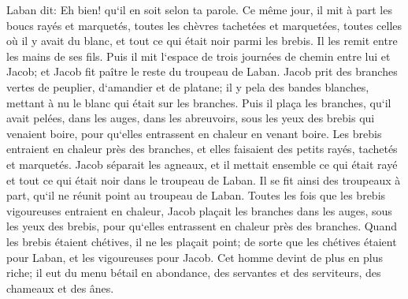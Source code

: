 \verse Laban dit: Eh bien! qu`il en soit selon ta parole. 
\verse Ce même jour, il mit à part les boucs rayés et marquetés, toutes les chèvres tachetées et marquetées, toutes celles où il y avait du blanc, et tout ce qui était noir parmi les brebis. Il les remit entre les mains de ses fils. 
\verse Puis il mit l`espace de trois journées de chemin entre lui et Jacob; et Jacob fit paître le reste du troupeau de Laban. 
\verse Jacob prit des branches vertes de peuplier, d`amandier et de platane; il y pela des bandes blanches, mettant à nu le blanc qui était sur les branches. 
\verse Puis il plaça les branches, qu`il avait pelées, dans les auges, dans les abreuvoirs, sous les yeux des brebis qui venaient boire, pour qu`elles entrassent en chaleur en venant boire. 
\verse Les brebis entraient en chaleur près des branches, et elles faisaient des petits rayés, tachetés et marquetés. 
\verse Jacob séparait les agneaux, et il mettait ensemble ce qui était rayé et tout ce qui était noir dans le troupeau de Laban. Il se fit ainsi des troupeaux à part, qu`il ne réunit point au troupeau de Laban. 
\verse Toutes les fois que les brebis vigoureuses entraient en chaleur, Jacob plaçait les branches dans les auges, sous les yeux des brebis, pour qu`elles entrassent en chaleur près des branches. 
\verse Quand les brebis étaient chétives, il ne les plaçait point; de sorte que les chétives étaient pour Laban, et les vigoureuses pour Jacob. 
\verse Cet homme devint de plus en plus riche; il eut du menu bétail en abondance, des servantes et des serviteurs, des chameaux et des ânes. 

